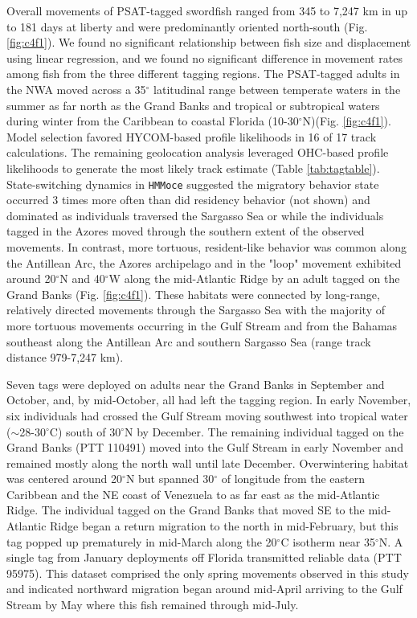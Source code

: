 Overall movements of PSAT-tagged swordfish ranged from 345 to 7,247 km in up to 181 days at liberty and were predominantly oriented north-south (Fig. \ref{fig:c4f1}). We found no significant relationship between fish size and displacement using linear regression, and we found no significant difference in movement rates among fish from the three different tagging regions. The PSAT-tagged adults in the NWA moved across a 35$^{\circ}$ latitudinal range between temperate waters in the summer as far north as the Grand Banks and tropical or subtropical waters during winter from the Caribbean to coastal Florida (10-30$^{\circ}$N)(Fig. \ref{fig:c4f1}). Model selection favored HYCOM-based profile likelihoods in 16 of 17 track calculations. The remaining geolocation analysis leveraged OHC-based profile likelihoods to generate the most likely track estimate (Table \ref{tab:tagtable}). State-switching dynamics in \texttt{HMMoce} suggested the migratory behavior state occurred 3 times more often than did residency behavior (not shown) and dominated as individuals traversed the Sargasso Sea or while the individuals tagged in the Azores moved through the southern extent of the observed movements. In contrast, more tortuous, resident-like behavior was common along the Antillean Arc, the Azores archipelago and in the "loop" movement exhibited around 20$^{\circ}$N and 40$^{\circ}$W along the mid-Atlantic Ridge by an adult tagged on the Grand Banks (Fig. \ref{fig:c4f1}). These habitats were connected by long-range, relatively directed movements through the Sargasso Sea with the majority of more tortuous movements occurring in the Gulf Stream and from the Bahamas southeast along the Antillean Arc and southern Sargasso Sea (range track distance 979-7,247 km).

Seven tags were deployed on adults near the Grand Banks in September and October, and, by mid-October, all had left the tagging region. In early November, six individuals had crossed the Gulf Stream moving southwest into tropical water ($\sim$28-30$^{\circ}$C) south of 30$^{\circ}$N by December. The remaining individual tagged on the Grand Banks (PTT 110491) moved into the Gulf Stream in early November and remained mostly along the north wall until late December. Overwintering habitat was centered around 20$^{\circ}$N but spanned 30$^{\circ}$ of longitude from the eastern Caribbean and the NE coast of Venezuela to as far east as the mid-Atlantic Ridge. The individual tagged on the Grand Banks that moved SE to the mid-Atlantic Ridge began a return migration to the north in mid-February, but this tag popped up prematurely in mid-March along the 20$^{\circ}$C isotherm near 35$^{\circ}$N. A single tag from January deployments off Florida transmitted reliable data (PTT 95975). This dataset comprised the only spring movements observed in this study and indicated northward migration began around mid-April arriving to the Gulf Stream by May where this fish remained through mid-July.

